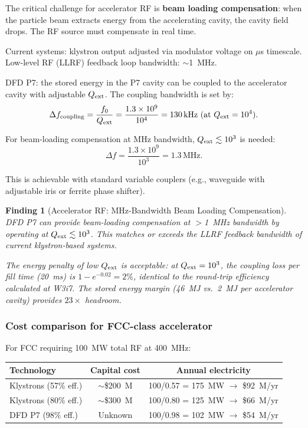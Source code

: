\documentclass[11pt]{article}
\newtheorem{finding}{Finding}
\newcommand{\ee}[1]{\times 10^{#1}}
\begin{document}
The critical challenge for accelerator RF is \textbf{beam loading
compensation}: when the particle beam extracts energy from the
accelerating cavity, the cavity field drops. The RF source must
compensate in real time.

Current systems: klystron output adjusted via modulator voltage on
$\mu$s timescale. Low-level RF (LLRF) feedback loop bandwidth:
$\sim$1~MHz.

DFD P7: the stored energy in the P7 cavity can be coupled to the
accelerator cavity with adjustable $Q_{\rm ext}$. The coupling
bandwidth is set by:
\begin{equation}
\Delta f_{\rm coupling} = \frac{f_0}{Q_{\rm ext}}
= \frac{1.3\ee{9}}{10^4} = 130\,\text{kHz (at $Q_{\rm ext} = 10^4$)}.
\end{equation}

For beam-loading compensation at MHz bandwidth, $Q_{\rm ext} \lesssim
10^3$ is needed:
\begin{equation}
\Delta f = \frac{1.3\ee{9}}{10^3} = 1.3\,\text{MHz}.
\end{equation}

This is achievable with standard variable couplers (e.g., waveguide
with adjustable iris or ferrite phase shifter).

\begin{finding}[Accelerator RF: MHz-Bandwidth Beam Loading Compensation]
\label{find:beam-loading}
DFD P7 can provide beam-loading compensation at $>$1~MHz bandwidth
by operating at $Q_{\rm ext} \lesssim 10^3$. This matches or exceeds
the LLRF feedback bandwidth of current klystron-based systems.

The energy penalty of low $Q_{\rm ext}$ is acceptable: at $Q_{\rm ext}
= 10^3$, the coupling loss per fill time (20~ms) is $1 - e^{-0.02}
= 2\%$, identical to the round-trip efficiency calculated at W3i7.
The stored energy margin (46~MJ vs.\ 2~MJ per accelerator cavity)
provides $23\times$ headroom.
\end{finding}

\subsubsection{Cost comparison for FCC-class accelerator}

For FCC requiring 100~MW total RF at 400~MHz:
\begin{center}
\begin{tabular}{lcc}
\toprule
Technology & Capital cost & Annual electricity \\
\midrule
Klystrons (57\% eff.) & $\sim$\$200~M & 100/0.57 = 175~MW $\to$ \$92~M/yr \\
Klystrons (80\% eff.) & $\sim$\$300~M & 100/0.80 = 125~MW $\to$ \$66~M/yr \\
DFD P7 (98\% eff.) & Unknown & 100/0.98 = 102~MW $\to$ \$54~M/yr \\
\bottomrule
\end{tabular}
\end{center}
\end{document}
